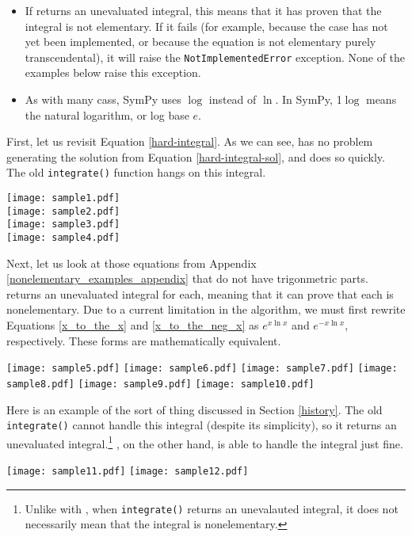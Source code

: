 \begin{itemize}
\item If \rischintegrate{} returns an unevaluated integral, this means
that it has proven that the integral is not \gls{elementary}.  If it
fails (for example, because the case has not yet been implemented, or
because the equation is not \gls{elementary} purely
\gls{transcendental}), it will raise the \texttt{NotImplementedError}
exception.  None of the examples below raise this exception.

\item As with many \glspl{cas}, SymPy uses $\log$ instead of $\ln$. 
In SymPy, 1$\log$ means the natural logarithm, or log base $e$.
\end{itemize}

First, let us revisit Equation \ref{hard-integral}.  As we can see,
\rischintegrate{} has no problem generating the solution from Equation
\ref{hard-integral-sol}, and does so quickly.  The old
\texttt{integrate()} function hangs on this integral.

\begin{flushleft}
\texttt{[image: sample1.pdf]}\\
\texttt{[image: sample2.pdf]}\\
\texttt{[image: sample3.pdf]}\\
\texttt{[image: sample4.pdf]}
\end{flushleft}

Next, let us look at those equations from Appendix
\ref{nonelementary_examples_appendix} that do not have
trigonmetric parts.  \rischintegrate{} returns an unevaluated integral for
each, meaning that it can prove that each is nonelementary.  Due to a
current limitation in the algorithm, we must first rewrite Equations
\ref{x_to_the_x} and \ref{x_to_the_neg_x} as $e^{x\ln{x}}$ and
$e^{-x\ln{x}}$, respectively.  These forms are mathematically equivalent.

\begin{flushleft}
\texttt{[image: sample5.pdf]}
\texttt{[image: sample6.pdf]}
\texttt{[image: sample7.pdf]}
\texttt{[image: sample8.pdf]}
\texttt{[image: sample9.pdf]}
\texttt{[image: sample10.pdf]}
\end{flushleft}

Here is an example of the sort of thing discussed in Section
\ref{history}.  The old \texttt{integrate()} cannot handle this integral
(despite its simplicity), so it returns an unevaluated
integral.\footnote{Unlike with \rischintegrate{}, when
\texttt{integrate()} returns an unevalauted integral, it does not
necessarily mean that the integral is nonelementary.} 
\rischintegrate{}, on the other hand, is able to handle the integral
just fine.

\begin{flushleft}
\texttt{[image: sample11.pdf]}
\texttt{[image: sample12.pdf]}
\end{flushleft}
